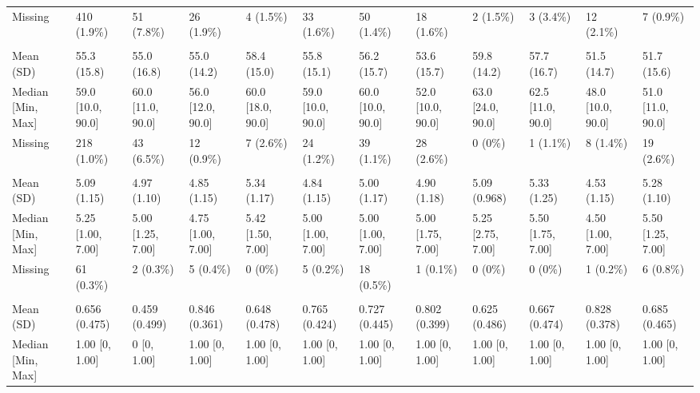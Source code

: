 \documentclass[
  single column]{article}
\begin{document}
\begin{landscape}
\begin{longtable}[t]{llllllllllll}
\hspace{1em}Missing & 410 (1.9\%) & 51 (7.8\%) & 26 (1.9\%) & 4 (1.5\%) & 33 (1.6\%) & 50 (1.4\%) & 18 (1.6\%) & 2 (1.5\%) & 3 (3.4\%) & 12 (2.1\%) & 7 (0.9\%)\\
\addlinespace[0.3em]
\multicolumn{12}{l}{\textbf{New Zealand Socio-Economic Index 2018 (Level)}}\\
\hspace{1em}Mean (SD) & 55.3 (15.8) & 55.0 (16.8) & 55.0 (14.2) & 58.4 (15.0) & 55.8 (15.1) & 56.2 (15.7) & 53.6 (15.7) & 59.8 (14.2) & 57.7 (16.7) & 51.5 (14.7) & 51.7 (15.6)\\
\hspace{1em}Median [Min, Max] & 59.0 [10.0, 90.0] & 60.0 [11.0, 90.0] & 56.0 [12.0, 90.0] & 60.0 [18.0, 90.0] & 59.0 [10.0, 90.0] & 60.0 [10.0, 90.0] & 52.0 [10.0, 90.0] & 63.0 [24.0, 90.0] & 62.5 [11.0, 90.0] & 48.0 [10.0, 90.0] & 51.0 [11.0, 90.0]\\
\hspace{1em}Missing & 218 (1.0\%) & 43 (6.5\%) & 12 (0.9\%) & 7 (2.6\%) & 24 (1.2\%) & 39 (1.1\%) & 28 (2.6\%) & 0 (0\%) & 1 (1.1\%) & 8 (1.4\%) & 19 (2.6\%)\\
\addlinespace[0.3em]
\multicolumn{12}{l}{\textbf{Openness (Personality Trait)}}\\
\hspace{1em}Mean (SD) & 5.09 (1.15) & 4.97 (1.10) & 4.85 (1.15) & 5.34 (1.17) & 4.84 (1.15) & 5.00 (1.17) & 4.90 (1.18) & 5.09 (0.968) & 5.33 (1.25) & 4.53 (1.15) & 5.28 (1.10)\\
\hspace{1em}Median [Min, Max] & 5.25 [1.00, 7.00] & 5.00 [1.25, 7.00] & 4.75 [1.00, 7.00] & 5.42 [1.50, 7.00] & 5.00 [1.00, 7.00] & 5.00 [1.00, 7.00] & 5.00 [1.75, 7.00] & 5.25 [2.75, 7.00] & 5.50 [1.75, 7.00] & 4.50 [1.00, 7.00] & 5.50 [1.25, 7.00]\\
\hspace{1em}Missing & 61 (0.3\%) & 2 (0.3\%) & 5 (0.4\%) & 0 (0\%) & 5 (0.2\%) & 18 (0.5\%) & 1 (0.1\%) & 0 (0\%) & 0 (0\%) & 1 (0.2\%) & 6 (0.8\%)\\
\addlinespace[0.3em]
\multicolumn{12}{l}{\textbf{Parental Status (Yes/No)}}\\
\hspace{1em}Mean (SD) & 0.656 (0.475) & 0.459 (0.499) & 0.846 (0.361) & 0.648 (0.478) & 0.765 (0.424) & 0.727 (0.445) & 0.802 (0.399) & 0.625 (0.486) & 0.667 (0.474) & 0.828 (0.378) & 0.685 (0.465)\\
\hspace{1em}Median [Min, Max] & 1.00 [0, 1.00] & 0 [0, 1.00] & 1.00 [0, 1.00] & 1.00 [0, 1.00] & 1.00 [0, 1.00] & 1.00 [0, 1.00] & 1.00 [0, 1.00] & 1.00 [0, 1.00] & 1.00 [0, 1.00] & 1.00 [0, 1.00] & 1.00 [0, 1.00]\\

\end{longtable}
\end{landscape}
\end{document}
